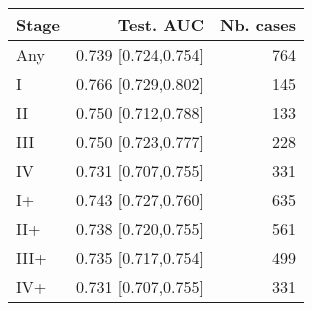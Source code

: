 \begin{table}[ht]
\centering
\begin{tabular}{lrr}
  \toprule
Stage & Test. AUC & Nb. cases \\ 
  \midrule
Any & 0.739 [0.724,0.754] & 764 \\ 
   \addlinespace
I & 0.766 [0.729,0.802] & 145 \\ 
  II & 0.750 [0.712,0.788] & 133 \\ 
  III & 0.750 [0.723,0.777] & 228 \\ 
  IV & 0.731 [0.707,0.755] & 331 \\ 
   \addlinespace
I+ & 0.743 [0.727,0.760] & 635 \\ 
  II+ & 0.738 [0.720,0.755] & 561 \\ 
  III+ & 0.735 [0.717,0.754] & 499 \\ 
  IV+ & 0.731 [0.707,0.755] & 331 \\ 
   \bottomrule
\end{tabular}
\end{table}
